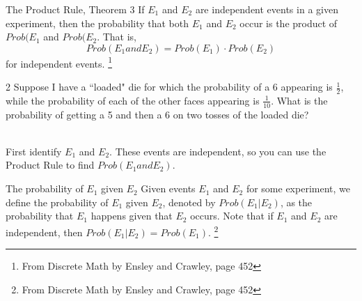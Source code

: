 \documentclass[a4paper,12pt]{book}
\newcounter{question}
\begin{document}
        \newpage{}
        \begin{intro}{The Product Rule, Theorem 3}
            If $E_{1}$ and $E_{2}$ are independent events in a given
            experiment, then the probability that both $E_{1}$ and $E_{2}$
            occur is the product of $Prob(E_{1}$ and $Prob(E_{2}$. That is,
            $$ Prob(E_{1} and E_{2}) = Prob(E_{1}) \cdot Prob(E_{2}) $$
            for independent events.
            \footnote{From Discrete Math by Ensley and Crawley, page 452}
        \end{intro}


        \begin{question}{\thequestion}{2}
            Suppose I have a ``loaded" die for which the probability of a 6
            appearing is $\frac{1}{2}$, while the probability of each of the other faces
            appearing is $\frac{1}{10}$. What is the probability of getting a 5
            and then a 6 on two tosses of the loaded die?

            ~\\
            First identify $E_{1}$ and $E_{2}$. These events are independent,
            so you can use the Product Rule to find $Prob(E_{1} and E_{2})$.

        \end{question}

        \begin{intro}{The probability of $E_{1}$ given $E_{2}$}
            Given events $E_{1}$ and $E_{2}$ for some experiment, we
            define the probability of $E_{1}$ given $E_{2}$, denoted by
            $Prob(E_{1} | E_{2})$, as the probability that $E_{1}$ happens
            given that $E_{2}$ occurs. Note that if $E_{1}$ and $E_{2}$
            are independent, then $Prob( E_{1} | E_{2}) = Prob(E_{1})$.
            \footnote{From Discrete Math by Ensley and Crawley, page 452}
        \end{intro}
\end{document}
